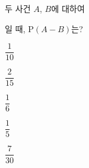 두 사건 $A$, $B$에 대하여 \par\smallskip{}\par\smallskip\noindent 일 때, $\mathrm{P}(A-B)$는?
\begin{choices32}{\rule[-3ex]{0pt}{8ex}$\dfrac{1}{10}$}{\rule[-3ex]{0pt}{8ex}$\dfrac{2}{15}$}{\rule[-3ex]{0pt}{8ex}$\dfrac{1}{6}$}{\rule[-3ex]{0pt}{8ex}$\dfrac{1}{5}$}{\rule[-3ex]{0pt}{8ex}$\dfrac{7}{30}$}\end{choices32}
